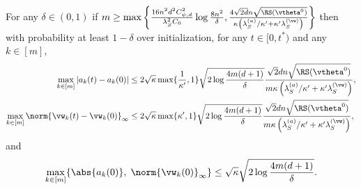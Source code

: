 \documentclass{article}
\begin{document}
\begin{prop}\label{prop:a_w}
    For any $\delta\in(0,1)$ if $m\geq\max\left\{\frac{16n^2d^2C_{\psi,d}^2}{\lambda_S^2C_0}\log\frac{8n^2}{\delta}, \frac{4\sqrt{2d}n\sqrt{\RS(\vtheta^0)}}{\kappa\left(\lambda_S^{(a)}/\kappa'+\kappa'\lambda_S^{(\vw)}\right)}\right\}$ then with probability at least $1-\delta$ over initialization, for any $t\in[0, t^\ast)$ and any $k\in [m]$,
    \begin{equation}
        \begin{aligned}
            \max\limits_{k\in[m]}|a_k(t) - a_k(0)|
             & \leq 2\sqrt{\kappa}\max\{\frac{1}{\kappa'},1\}\sqrt{2\log\frac{4m(d+1)}{\delta}}\frac{\sqrt{2}dn\sqrt{\RS(\vtheta^0)}}{m\kappa\left(\lambda_S^{(a)}/\kappa'+\kappa'\lambda_S^{(\vw)}\right)}, \\
            \max\limits_{k\in[m]}\norm{\vw_k(t) - \vw_k(0)}_{\infty}
             & \leq 2\sqrt{\kappa}\max\{
            \kappa',1\}\sqrt{2\log\frac{4m(d+1)}{\delta}}\frac{\sqrt{2}dn\sqrt{\RS(\vtheta^0)}}{m\kappa\left(\lambda_S^{(a)}/\kappa'+\kappa'\lambda_S^{(\vw)}\right)},
        \end{aligned}
    \end{equation}
    and
    \begin{equation}
        \max\limits_{k\in[m]}\{\abs{a_k(0)},\;\norm{\vw_k(0)}_{\infty}\} \leq \sqrt{\kappa}\sqrt{2\log\frac{4m(d+1)}{\delta}}.
    \end{equation}
\end{prop}
\end{document}

